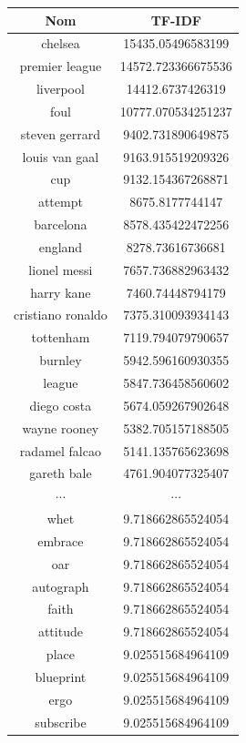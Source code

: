 \documentclass[a4paper, 12pt]{article}
\begin{document}
\begin{figure}[!h]
\begin{center}
 \begin{tabular}{|c|c|}
 \hline
  \textbf{Nom} & \textbf{TF-IDF} \\
  \hline
  chelsea  & 15435.05496583199 \\
  premier league  & 14572.723366675536 \\
  liverpool  & 14412.6737426319 \\
  foul  & 10777.070534251237 \\
  steven gerrard  & 9402.731890649875 \\
  louis van gaal  & 9163.915519209326 \\
  cup  & 9132.154367268871 \\
  attempt  & 8675.8177744147 \\
  barcelona  & 8578.435422472256 \\
  england  & 8278.73616736681 \\
  lionel messi  & 7657.736882963432 \\
  harry kane  & 7460.74448794179 \\
  cristiano ronaldo  & 7375.310093934143 \\
  tottenham  & 7119.794079790657 \\
  burnley  & 5942.596160930355 \\
  league  & 5847.736458560602 \\
  diego costa  & 5674.059267902648 \\
  wayne rooney  & 5382.705157188505 \\
  radamel falcao  & 5141.135765623698 \\
  gareth bale  & 4761.904077325407 \\
 $\cdots$ & $\cdots$ \\
  whet  & 9.718662865524054 \\
  embrace  & 9.718662865524054 \\
  oar  & 9.718662865524054 \\
  autograph  & 9.718662865524054 \\
  faith  & 9.718662865524054 \\
  attitude  & 9.718662865524054 \\
  place  & 9.025515684964109 \\
  blueprint  & 9.025515684964109 \\
  ergo  & 9.025515684964109 \\
  subscribe  & 9.025515684964109 \\

\end{tabular}
\end{center}
\end{figure}
\end{document}
